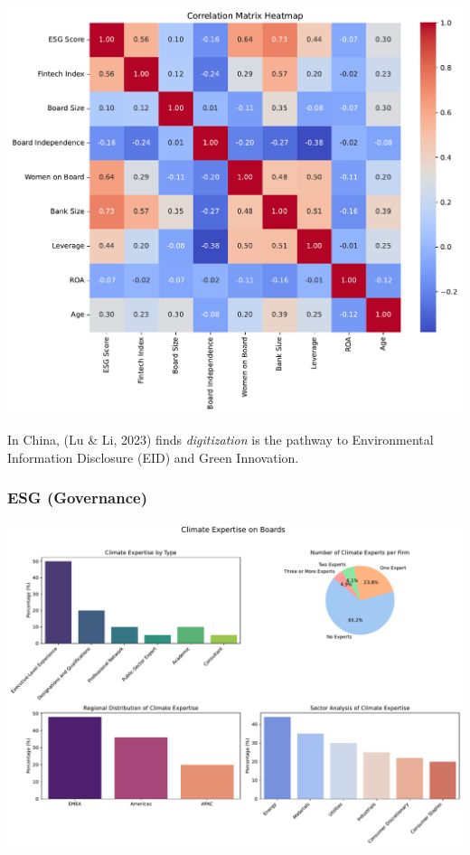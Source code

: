 \documentclass[
  letterpaper,
  DIV=11,
  numbers=noendperiod]{scrartcl}
\begin{document}
\includegraphics{_thesis_files/figure-pdf/cell-55-output-1.pdf}

In China, (Lu \& Li, 2023) finds \emph{digitization} is the pathway to
Environmental Information Disclosure (EID) and Green Innovation.

\subsubsection{ESG (Governance)}\label{esg-governance}

\includegraphics{_thesis_files/figure-pdf/cell-56-output-1.pdf}
\end{document}
